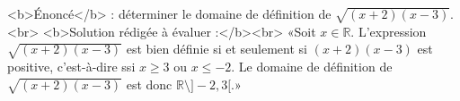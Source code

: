 <b>Énoncé</b> : déterminer le domaine de définition de $\sqrt{(x+2)(x-3)}$.<br> <b>Solution rédigée à évaluer :</b><br>  «Soit $x\in\mathbb{R}$.  L'expression $\sqrt{(x+2)(x-3)}$ est bien définie si et seulement si $(x+2)(x-3)$ est positive, c'est-à-dire ssi $x\geq 3$ ou $x\leq -2$. Le domaine de définition de $\sqrt{(x+2)(x-3)}$ est donc $\mathbb{R}\setminus ]-2,3[$.»

\begin{reponses}
\end{reponses}

